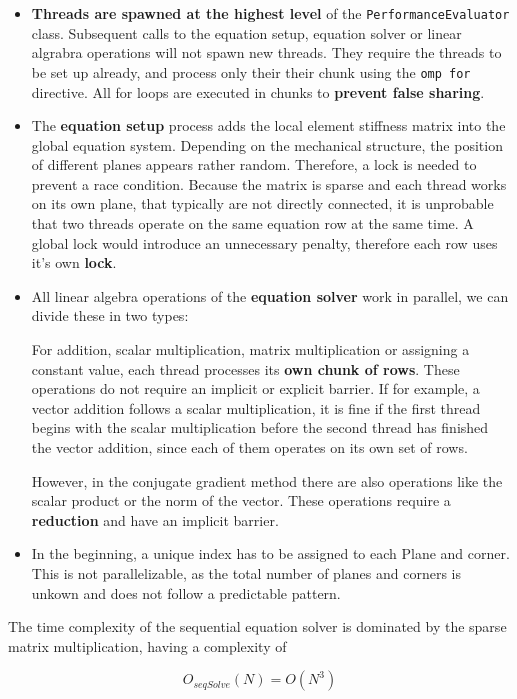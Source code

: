 \documentclass[12pt]{article}
\begin{document}
\begin{itemize}
    \item \textbf{Threads are spawned at the highest level} of the \texttt{PerformanceEvaluator} class. Subsequent calls to the equation setup, equation solver or linear algrabra operations will not spawn new threads. They require the threads to be set up already, and process only their their chunk using the \texttt{omp for} directive. All for loops are executed in chunks to \textbf{prevent false sharing}.
    \item The \textbf{equation setup} process adds the local element stiffness matrix into the global equation system. Depending on the mechanical structure, the position of different planes appears rather random. Therefore, a lock is needed to prevent a race condition. Because the matrix is sparse and each thread works on its own plane, that typically are not directly connected, it is unprobable that two threads operate on the same equation row at the same time. A global lock would introduce an unnecessary penalty, therefore each row uses it's own \textbf{lock}.
    \item All linear algebra operations of the \textbf{equation solver} work in parallel, we can divide these in two types:
    
    For addition, scalar multiplication, matrix multiplication or assigning a constant value, each thread processes its \textbf{own chunk of rows}. These operations do not require an implicit or explicit barrier. If for example, a vector addition follows a scalar multiplication, it is fine if the first thread begins with the scalar multiplication before the second thread has finished the vector addition, since each of them operates on its own set of rows.
    
    However, in the conjugate gradient method there are also operations like the scalar product or the norm of the vector. These operations require a \textbf{reduction} and have an implicit barrier.
    \item In the beginning, a unique index has to be assigned to each Plane and corner. This is not parallelizable, as the total number of planes and corners is unkown and does not follow a predictable pattern.
\end{itemize}

The time complexity of the sequential equation solver is dominated by the sparse matrix multiplication, having a complexity of 

\begin{equation}
    O_\mathit{seqSolve}(N) = O(N^3) 
\end{equation}
\end{document}

